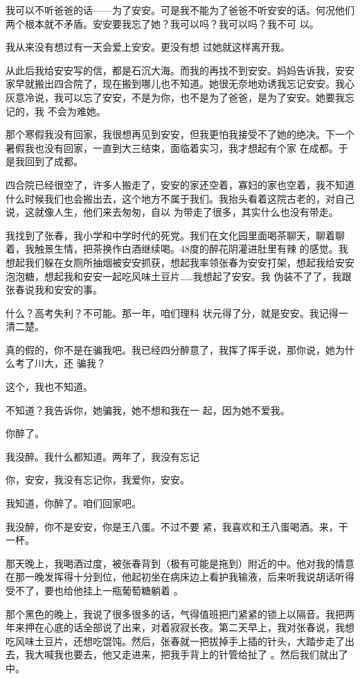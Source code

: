 \documentclass{article}
\begin{document}
我可以不听爸爸的话——为了安安。可是我不能为了爸爸不听安安的话。何况他们两个根本就不矛盾。安安要我忘了她？我可以吗？我可以吗？我不可
以。 

我从来没有想过有一天会爱上安安。更没有想
过她就这样离开我。 

\newpage

从此后我给安安写的信，都是石沉大海。而我的再找不到安安。妈妈告诉我，安安家早就搬出四合院了，现在搬到哪儿也不知道。她很无奈地劝诱我忘记安安。我心灰意冷说，我可以忘了安安，不是为你，也不是为了爸爸，是为了安安。她要我忘记的，我
不会为难她。 

那个寒假我没有回家，我很想再见到安安，但我更怕我接受不了她的绝决。下一个暑假我也没有回家，一直到大三结束，面临着实习，我才想起有个家
在成都。于是我回到了成都。 

四合院已经很空了，许多人搬走了，安安的家还空着，寡妇的家也空着，我不知道什么时候我们也会搬出去，这个地方不属于我们。我抬头看着这院古老的，对自己说，这就像人生，他们来去匆匆，自以
为带走了很多，其实什么也没有带走。 

我找到了张春，我小学和中学时代的死党。我们在文化园里面喝茶聊天，聊着聊着，我触景生情，把茶换作白酒继续喝。48度的醉花阴灌进肚里有辣
\newpage
的感觉。我想起我们躲在女厕所抽烟被安安抓获，想起我率领张春为安安打架，想起我给安安泡泡糖，想起我和安安一起吃风味土豆片……我想起了安安。我
伪装不了了，我跟张春说我和安安的事。 

什么？高考失利？不可能。那一年，咱们理科
状元得了分，就是安安。我记得一清二楚。 

真的假的，你不是在骗我吧。我已经四分醉意了，我挥了挥手说，那你说，她为什么考了川大，还
骗我？ 


这个，我也不知道。 

不知道？我告诉你，她骗我，她不想和我在一
起，因为她不爱我。 


你醉了。 

我没醉。我什么都知道。两年了，我没有忘记

\newpage
你，安安，我没有忘记你，我爱你，安安。 


我知道，你醉了。咱们回家吧。 

我没醉，你不是安安，你是王八蛋。不过不要
紧，我喜欢和王八蛋喝酒。来，干一杯。 

那天晚上，我喝酒过度，被张春背到（极有可能是拖到）附近的中。他对我的情意在那一晚发挥得十分到位，他起初坐在病床边上看护我输液，后来听我说胡话听得受不了，要也给他挂上一瓶葡萄糖躺着
。 

那个黑色的晚上，我说了很多很多的话，气得值班把门紧紧的锁上以隔音。我把两年来押在心底的话全部说了出来，对着寂寂长夜。第二天早上，我对张春说，我想吃风味土豆片，还想吃馄饨。然后，张春就一把拔掉手上插的针头，大踏步走了出去，我大喊我也要去，他又走进来，把我手背上的针管给扯了
。然后我们就出了中。 
\end{document}
